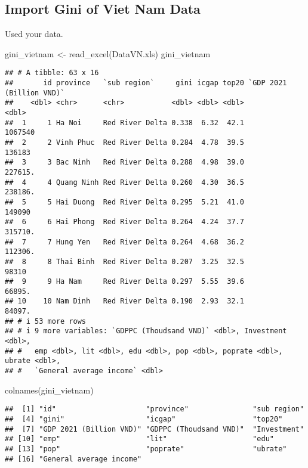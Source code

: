 \documentclass[
]{article}
\newenvironment{Shaded}{\begin{snugshade}}{\end{snugshade}}
\newcommand{\FunctionTok}[1]{\textcolor[rgb]{0.00,0.00,0.00}{#1}}
\newcommand{\NormalTok}[1]{#1}
\newcommand{\OtherTok}[1]{\textcolor[rgb]{0.56,0.35,0.01}{#1}}
\newcommand{\StringTok}[1]{\textcolor[rgb]{0.31,0.60,0.02}{#1}}
\begin{document}
\hypertarget{import-gini-of-viet-nam-data}{%
\subsection{Import Gini of Viet Nam
Data}\label{import-gini-of-viet-nam-data}}

Used your data.

\begin{Shaded}
\begin{Highlighting}[]
\NormalTok{gini\_vietnam }\OtherTok{\textless{}{-}} \FunctionTok{read\_excel}\NormalTok{(}\StringTok{\textquotesingle{}DataVN.xls\textquotesingle{}}\NormalTok{)}
\NormalTok{gini\_vietnam}
\end{Highlighting}
\end{Shaded}

\begin{verbatim}
## # A tibble: 63 x 16
##       id province   `sub region`     gini icgap top20 `GDP 2021 (Billion VND)`
##    <dbl> <chr>      <chr>           <dbl> <dbl> <dbl>                    <dbl>
##  1     1 Ha Noi     Red River Delta 0.338  6.32  42.1                 1067540 
##  2     2 Vinh Phuc  Red River Delta 0.284  4.78  39.5                  136183 
##  3     3 Bac Ninh   Red River Delta 0.288  4.98  39.0                  227615.
##  4     4 Quang Ninh Red River Delta 0.260  4.30  36.5                  238186.
##  5     5 Hai Duong  Red River Delta 0.295  5.21  41.0                  149090 
##  6     6 Hai Phong  Red River Delta 0.264  4.24  37.7                  315710.
##  7     7 Hung Yen   Red River Delta 0.264  4.68  36.2                  112306.
##  8     8 Thai Binh  Red River Delta 0.207  3.25  32.5                   98310 
##  9     9 Ha Nam     Red River Delta 0.297  5.55  39.6                   66895.
## 10    10 Nam Dinh   Red River Delta 0.190  2.93  32.1                   84097.
## # i 53 more rows
## # i 9 more variables: `GDPPC (Thoudsand VND)` <dbl>, Investment <dbl>,
## #   emp <dbl>, lit <dbl>, edu <dbl>, pop <dbl>, poprate <dbl>, ubrate <dbl>,
## #   `General average income` <dbl>
\end{verbatim}

\begin{Shaded}
\begin{Highlighting}[]
\FunctionTok{colnames}\NormalTok{(gini\_vietnam)}
\end{Highlighting}
\end{Shaded}

\begin{verbatim}
##  [1] "id"                     "province"               "sub region"            
##  [4] "gini"                   "icgap"                  "top20"                 
##  [7] "GDP 2021 (Billion VND)" "GDPPC (Thoudsand VND)"  "Investment"            
## [10] "emp"                    "lit"                    "edu"                   
## [13] "pop"                    "poprate"                "ubrate"                
## [16] "General average income"
\end{verbatim}
\end{document}
